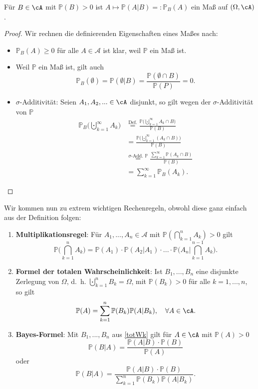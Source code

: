 \begin{lemma}
	Für $ B \in \cA$ mit $ \mathbb{P}(B)> 0$ ist $ A \mapsto \mathbb{P}(A|B) =: \mathbb{P}_B(A)$ ein Maß auf $(\Omega, \cA)$.
\end{lemma}

\begin{proof}
	Wir rechnen die definierenden Eigenschaften eines Ma\ss es nach:
	\begin{itemize}
		\item $\mathbb P_B(A) \geq 0$ f\"ur alle $A\in \mathcal A$ ist klar, weil $\mathbb P$ ein Ma\ss{} ist.
		\item Weil $\mathbb P$ ein Ma\ss{} ist, gilt auch 
		\[ \mathbb{P}_B(\emptyset) = \mathbb{P}(\emptyset|B) = \frac{\mathbb{P}(\emptyset \cap B)}{\mathbb{P}(P)} = 0. \]
		\item $\sigma$-Additivität: Seien $A_1,A_2,... \in \cA$ disjunkt, so gilt wegen der $\sigma$-Additivit\"at von $\mathbb P$
		\begin{align*}
			\mathbb{P}_B\Big(\bigcupdot_{k=1}^{\infty} A_k \Big)& \overset{\text{Def.}}{=} \frac{\mathbb{P}\Big(\bigcupdot_{k=1}^{\infty} A_k \cap B\Big)}{\mathbb{P}(B)}\\
			&= \frac{\mathbb{P}\Big(\bigcupdot_{k=1}^{\infty} (A_k \cap B) \Big)}{\mathbb{P}(B)} \\
			&\overset{\sigma\text{-Add. }\mathbb{P}}{=} \frac{\sum\limits_{k=1}^{\infty} \mathbb{P}(A_k \cap B)}{\mathbb{P}(B)}\\
			& = \sum\limits_{k=1}^{\infty} \mathbb{P}_B(A_k).
		\end{align*}
	\end{itemize}
\end{proof}
Wir kommen nun zu extrem wichtigen Rechenregeln, obwohl diese ganz einfach aus der Definition folgen:
\begin{satz}\abs
	\begin{enumerate}[label=(\roman*)]
		\item \label{multipl} \textbf{Multiplikationsregel}: Für $A_1,...,A_n\in \mathcal A$ mit $\mathbb{P}(\bigcap_{k=1}^{n} A_k) > 0$ gilt
		\[ \mathbb{P}\Big(\bigcap_{k=1}^{n} A_k\Big) = \mathbb{P}(A_1)\cdot \mathbb{P}(A_2|A_1)\cdot ... \cdot \mathbb{P}\Big(A_n\Big|\bigcap_{k=1}^{n-1} A_k\Big). \]
		\item \label{totWk} \textbf{Formel der totalen Wahrscheinlichkeit}: Ist $B_1,...,B_n$ eine disjunkte Zerlegung von $\Omega$, \mbox{d. h.}  $\bigcupdot_{k=1}^{n} B_k = \Omega$, mit $\mathbb P(B_k)>0$ f\"ur alle $k=1,...,n$, so gilt 
		\[ \mathbb{P}(A) = \sum\limits_{k=1}^{n} \mathbb{P}(B_k)\mathbb{P}(A|B_k), \quad \forall A \in \cA. \]
		\item \label{bayes} \textbf{Bayes-Formel}: Mit $B_1,...,B_n$ aus \ref{totWk} gilt für $A \in \cA$ mit $\mathbb{P}(A) > 0$ \[ \mathbb{P}(B|A) = \frac{\mathbb{P}(A|B) \cdot \mathbb{P}(B)}{\mathbb{P}(A)} \] oder \[ \mathbb{P}(B|A) = \frac{\mathbb{P}(A|B) \cdot \mathbb{P}(B)}{\sum\limits_{k=1}^{n} \mathbb{P}(B_k) \mathbb{P}(A | B_k)}. \]
	\end{enumerate}
\end{satz}

